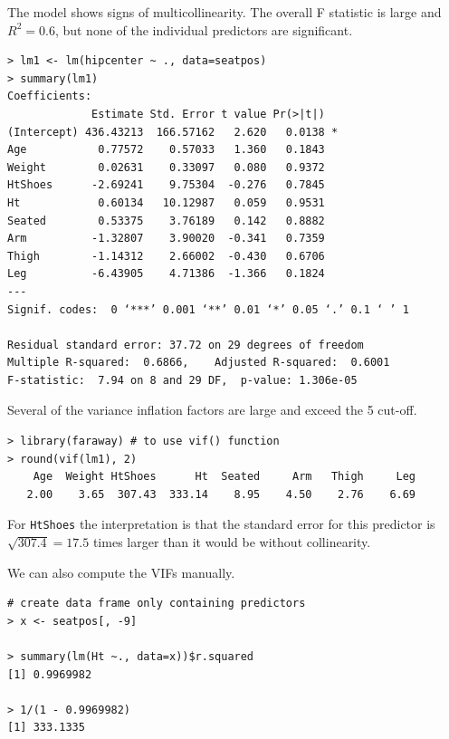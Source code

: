 \documentclass[10pt]{beamer}\usepackage[]{graphicx}\usepackage[]{color}
\begin{document}
\begin{frame}[fragile]
The model shows signs of multicollinearity.  The overall F statistic is large and $R^2=0.6$, but none of the individual predictors are significant.  
\scriptsize
\begin{verbatim}
> lm1 <- lm(hipcenter ~ ., data=seatpos)
> summary(lm1)
Coefficients:
             Estimate Std. Error t value Pr(>|t|)
(Intercept) 436.43213  166.57162   2.620   0.0138 *
Age           0.77572    0.57033   1.360   0.1843
Weight        0.02631    0.33097   0.080   0.9372
HtShoes      -2.69241    9.75304  -0.276   0.7845
Ht            0.60134   10.12987   0.059   0.9531
Seated        0.53375    3.76189   0.142   0.8882
Arm          -1.32807    3.90020  -0.341   0.7359
Thigh        -1.14312    2.66002  -0.430   0.6706
Leg          -6.43905    4.71386  -1.366   0.1824
---
Signif. codes:  0 ‘***’ 0.001 ‘**’ 0.01 ‘*’ 0.05 ‘.’ 0.1 ‘ ’ 1

Residual standard error: 37.72 on 29 degrees of freedom
Multiple R-squared:  0.6866,	Adjusted R-squared:  0.6001
F-statistic:  7.94 on 8 and 29 DF,  p-value: 1.306e-05
\end{verbatim}
\end{frame}

\begin{frame}[fragile]
Several of the variance inflation factors are large and exceed the 5 cut-off.\\
\small
\begin{verbatim}
> library(faraway) # to use vif() function
> round(vif(lm1), 2)
    Age  Weight HtShoes      Ht  Seated     Arm   Thigh     Leg 
   2.00    3.65  307.43  333.14    8.95    4.50    2.76    6.69 
\end{verbatim}
For \texttt{HtShoes} the interpretation is that the standard error for this predictor is $\sqrt{307.4} = 17.5$ times larger than it would be without collinearity.
\end{frame}

\begin{frame}[fragile]
We can also compute the VIFs manually.

\begin{verbatim}
# create data frame only containing predictors
> x <- seatpos[, -9] 

> summary(lm(Ht ~., data=x))$r.squared
[1] 0.9969982

> 1/(1 - 0.9969982)
[1] 333.1335
\end{verbatim}
\end{frame}
\end{document}
